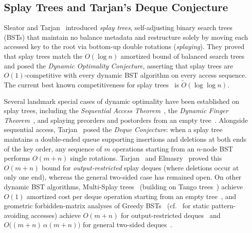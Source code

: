 \documentclass[11pt]{article}
\theoremstyle{definition}
\theoremstyle{remark}
\begin{document}
\subsection{Splay Trees and Tarjan's Deque Conjecture}

Sleator and Tarjan~\cite{SleatorTarjan1985} introduced \emph{splay trees}, self-adjusting binary search trees (BSTs) that maintain no balance metadata and restructure solely by moving each accessed key to the root via bottom-up double rotations (\emph{splaying}). They proved that splay trees match the $O(\log n)$ amortized bound of balanced search trees and posed the \emph{Dynamic Optimality Conjecture}, asserting that splay trees are $O(1)$-competitive with every dynamic BST algorithm on every access sequence. The current best known competitiveness for splay trees~\cite{Splay2026} is $\tilde O(\log\log n)$.  

Several landmark special cases of dynamic optimality have been established on splay trees, including the \emph{Sequential Access Theorem}~\cite{Tarjan1985,Elmasry2004}, the \emph{Dynamic Finger Theorem}~\cite{ColeMishraSchmidtSiegel2000,Cole2000}, and splaying preorders and postorders from an empty tree~\cite{LevyTarjan2019}. Alongside sequential access, Tarjan~\cite{Tarjan1985} posed the \emph{Deque Conjecture}: when a splay tree maintains a double-ended queue supporting insertions and deletions at both ends of the key order, any sequence of $m$ operations starting from an $n$-node BST performs $O(m + n)$ single rotations. Tarjan~\cite{Tarjan1985} and Elmasry~\cite{Elmasry2004} proved this $O(m + n)$ bound for \emph{output-restricted} splay deques (where deletions occur at only one end), whereas the general two-sided case has remained open. On other dynamic BST algorithms, Multi-Splay trees~\cite{WangDerryberrySleator2006} (building on Tango trees~\cite{DemaineHarmonIaconoPatrascu2007}) achieve $O(1)$ amortized cost per deque operation starting from an empty tree~\cite{DerryberrySleatorWang2009}, and geometric forbidden-matrix analyses of Greedy BSTs~\cite{DemaineHarmonIaconoKanePatrascu2009} (cf.~\cite{ChalermsookGoswamiKozmaMehlhornSaranurak2015FOCS} for static pattern-avoiding accesses) achieve $O(m + n)$ for output-restricted deques~\cite{ChalermsookGoswamiKozmaMehlhornSaranurak2015WADS} and $O\big((m + n)\,\alpha(m + n)\big)$ for general two-sided deques~\cite{Chalermsook2023}.
\end{document}
